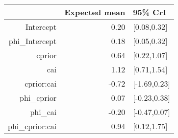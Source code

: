 \begin{tabular}{rrl}
  \hline
 & Expected mean & 95\% CrI \\ 
  \hline
Intercept & 0.20 & [0.08,0.32] \\ 
  phi\_Intercept & 0.18 & [0.05,0.32] \\ 
  cprior & 0.64 & [0.22,1.07] \\ 
  cai & 1.12 & [0.71,1.54] \\ 
  cprior:cai & -0.72 & [-1.69,0.23] \\ 
  phi\_cprior & 0.07 & [-0.23,0.38] \\ 
  phi\_cai & -0.20 & [-0.47,0.07] \\ 
  phi\_cprior:cai & 0.94 & [0.12,1.75] \\ 
   \hline
\end{tabular}

